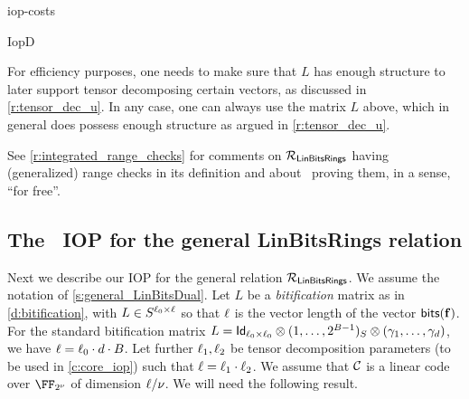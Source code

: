 \begin{lncsappendix}{iop-costs}
\begin{lncsmove}{IopD}
\begin{remark}
For efficiency purposes, one needs to make sure that $L$ has enough structure to later support  tensor decomposing certain vectors, as discussed in \cref{r:tensor_dec_u}. In any case, one can always use the matrix $L$ above, which in general does possess enough structure as argued in \cref{r:tensor_dec_u}.
%
\end{remark}

\iflncs\else See \cref{r:integrated_range_checks} for comments on $\mathcal{R}_{\mathsf{LinBitsRings}}$ having (generalized) range checks in its definition and about \ftwoz\ proving them, in a sense, ``for free''.\fi


\subsection{The \ftwoz\  IOP for the general LinBitsRings relation}\label{s: general_bitz}



\renewcommand{\modulemorphism}{\psi}
\renewcommand{\ringmorphism}{\psi}
\renewcommand{\moduleonebound}{{S_{\leq B}^{<D_S}}}

Next we describe our IOP for  the general relation $\mathcal{R}_{\mathsf{LinBitsRings}}$.  We assume the notation of \cref{s:general_LinBitsDual}. Let  $L$ be a \emph{bitification} matrix as in \cref{d:bitification}, with $L\in S^{\ell_0 \times \ell}$ so that $\ell$ is the vector length of the vector $\mathsf{bits}(\mathbf{f})$. For the standard bitification matrix   $L=\mathsf{Id}_{\ell_0 \times \ell_0} \otimes (1,\ldots, 2^{B-1})_S\otimes (\gamma_1, \ldots, \gamma_d)$, we have $\ell=\ell_0\cdot d\cdot B$. Let further $\ell_1,\ell_2$ be tensor decomposition parameters (to be used in \cref{c:core_iop}) such that $\ell=\ell_1\cdot \ell_2$. We assume that $\mathcal{C}$ is a linear code over $\comfield$ of dimension $\ell/\nu$. %
%
We will need the following result.



\end{lncsmove}
\end{lncsappendix}
